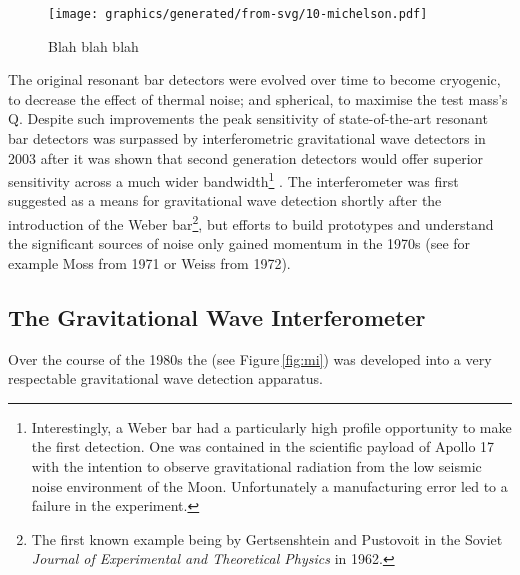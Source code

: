 \begin{wrapfigure}{r}{0.5\textwidth}
  \texttt{[image: graphics/generated/from-svg/10-michelson.pdf]}
  \caption{Blah blah blah}
\end{wrapfigure}

The original resonant bar detectors were evolved over time to become cryogenic, to decrease the effect of thermal noise; and spherical, to maximise the test mass's Q. Despite such improvements the peak sensitivity of state-of-the-art resonant bar detectors was surpassed by interferometric gravitational wave detectors in 2003 \cite{Pitkin2011} after it was shown that second generation detectors would offer superior sensitivity across a much wider bandwidth\footnote{Interestingly, a Weber bar had a particularly high profile opportunity to make the first detection. One was contained in the scientific payload of Apollo 17 with the intention to observe gravitational radiation from the low seismic noise environment of the Moon. Unfortunately a manufacturing error led to a failure in the experiment.} \cite{Harry2002a}. The interferometer was first suggested as a means for gravitational wave detection shortly after the introduction of the Weber bar\footnote{The first known example being by Gertsenshtein and Pustovoit in the Soviet \emph{Journal of Experimental and Theoretical Physics} in 1962.}, but efforts to build prototypes and understand the significant sources of noise only gained momentum in the 1970s (see for example Moss \etal \cite{Moss1971} from 1971 or Weiss \cite{Weiss1972} from 1972).


\subsection{The Gravitational Wave Interferometer}

Over the course of the 1980s the \MI (see Figure\,\ref{fig:mi}) was developed into a very respectable gravitational wave detection apparatus.

